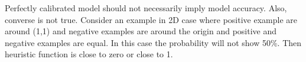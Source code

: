 \begin{answer}
Perfectly calibrated model should not necessarily imply model accuracy. 
Also, converse is not true. Consider an example in 2D case where positive example are around (1,1) and negative examples are around the origin and positive and negative examples are equal. In this case the probability will not show 50\%. Then heuristic function is close to zero or close to 1.
\end{answer}
